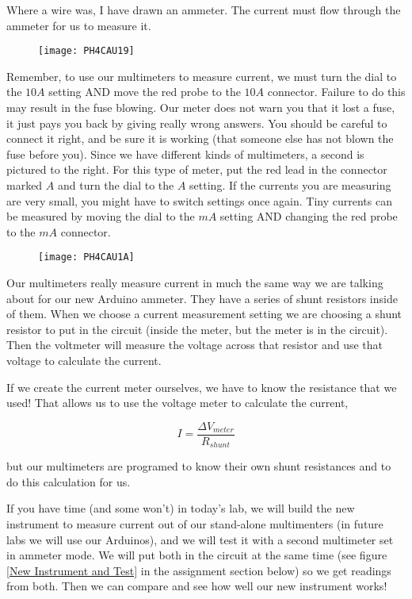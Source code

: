 Where a wire was, I have drawn an ammeter. The current must flow through the ammeter for us to measure it.

\begin{figure}[h!]
	\centering
    \texttt{[image: PH4CAU19]}
\end{figure} 

Remember, to use our multimeters to measure current, we must turn the dial to the $10\unit{A}$ setting AND move the red probe to the $10\unit{A}$ connector. Failure to do this may result in the fuse blowing. Our meter does not warn you that it lost a fuse, it just pays you back by giving really wrong answers. You should be careful to connect it right, and be sure it is working (that someone else has not blown the fuse before you). Since we have different kinds of multimeters, a second is pictured to the right. For this type of meter, put the red lead in the connector marked $A$ and turn the dial to the $A$ setting. If the currents you are measuring are very small, you might have to switch settings once again. Tiny currents can be measured by moving the dial to the $\unit{mA}$ setting AND changing the red probe to the $\unit{mA}$ connector.

\begin{figure}[h!]
	\centering
    \texttt{[image: PH4CAU1A]}
\end{figure}

Our multimeters really measure current in much the same way we are talking about for our new Arduino ammeter. They have a series of shunt resistors inside of them. When we choose a current measurement setting we are choosing a shunt resistor to put in the circuit (inside the meter, but the meter is in the circuit). Then the voltmeter will measure the voltage across that resistor and use that voltage to calculate the current.

If we create the current meter ourselves, we have to know the resistance that we used! That allows us to use the voltage meter to calculate the current,

\begin{equation*}
	I=\frac{\Delta V_{meter}}{R_{shunt}}
\end{equation*}

\noindent but our multimeters are programed to know their own shunt resistances and to do this calculation for us.

If you have time (and some won't) in today's lab, we will build the new instrument to measure current out of our stand-alone multimenters (in future labs we will use our Arduinos), and we will test it with a second multimeter set in ammeter mode. We will put both in the circuit at the same time (see figure \ref{New Instrument and Test} in the assignment section below) so we get readings from both. Then we can compare and see how well our new instrument works!

